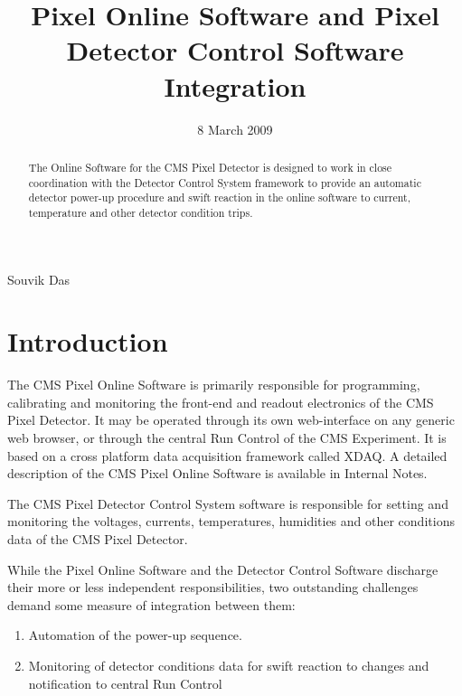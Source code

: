 \documentclass{cmspaper}
\begin{document}
\begin{titlepage}

     \date{8 March 2009}
     \title{Pixel Online Software and Pixel Detector Control Software Integration}
     \begin{Authlist}
      Souvik Das
     \end{Authlist}
 \submitted{}
 \collaboration{}
 \conference{}
 
 \begin{abstract}

The Online Software for the CMS Pixel Detector is designed to work in close coordination with the Detector Control System framework to provide an automatic detector power-up procedure and swift reaction in the online software to current, temperature and other detector condition trips.

 \end{abstract}
 
 \note{} 
 
\end{titlepage}


\section{Introduction}

The CMS Pixel Online Software is primarily responsible for programming, calibrating and monitoring the front-end and readout electronics of the CMS Pixel Detector. It may be operated through its own web-interface on any generic web browser, or through the central Run Control of the CMS Experiment. It is based on a cross platform data acquisition framework called XDAQ. A detailed description of the CMS Pixel Online Software is available in Internal Notes.

The CMS Pixel Detector Control System software is responsible for setting and monitoring the voltages, currents, temperatures, humidities and other conditions data of the CMS Pixel Detector.

While the Pixel Online Software and the Detector Control Software discharge their more or less independent responsibilities, two outstanding challenges demand some measure of integration between them:

\begin{enumerate}
\item Automation of the power-up sequence.
\item Monitoring of detector conditions data for swift reaction to changes and notification to central Run Control
\end{enumerate}
\end{document}
